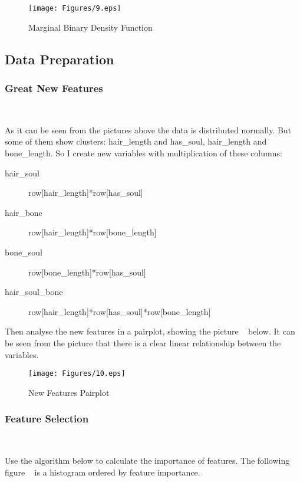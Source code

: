 \begin{figure}[h]\centering
	\texttt{[image: Figures/9.eps]}
	\caption{Marginal Binary Density Function}
\end{figure}


\subsection{Data Preparation}

\subsubsection{Great New Features}
\

As it can be seen from 
the pictures above 
the data is distributed normally. 
But some of them show clusters: 
hair\_length and has\_soul, 
hair\_length and bone\_length. 
So I create new variables 
with multiplication of these columns: 

\begin{description}
	\item[hair\_soul] row[hair\_length]*row[has\_soul] 
	\item[hair\_bone]  row[hair\_length]*row[bone\_length] 
	\item[bone\_soul]  row[bone\_length]*row[has\_soul] 
	\item[hair\_soul\_bone]  row[hair\_length]*row[has\_soul]*row[bone\_length] 
\end{description}


Then analyse the new features in a pairplot, 
showing the picture ~
below. 
It can be seen from the picture that 
there is a clear linear relationship 
between the variables. 


\begin{figure}[htbp]
	\centering
	\texttt{[image: Figures/10.eps]}
	\caption{New Features Pairplot}\label{fig:new_pairplot}
\end{figure}


\subsubsection{Feature Selection}
\

Use the algorithm below to 
calculate the importance of features.
The following figure ~
is a histogram ordered by feature importance. 

